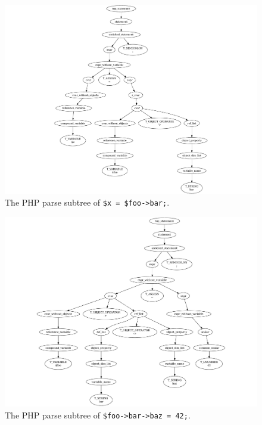 \begin{figure}[htb]
  \begin{center}
    \includegraphics[scale=0.7]{images/one-level-field-access-right}
   \caption{The PHP parse subtree of \texttt{\$x = \$foo->bar;}.}
   \label{fig:one-level-field-access-right}
  \end{center}
\end{figure}

\begin{figure}[htb]
  \begin{center}
    \includegraphics[scale=0.6]{images/multi-level-field-access-left}
   \caption{The PHP parse subtree of \texttt{\$foo->bar->baz = 42;}.}
   \label{fig:multi-level-field-access-left}
  \end{center}
\end{figure}

